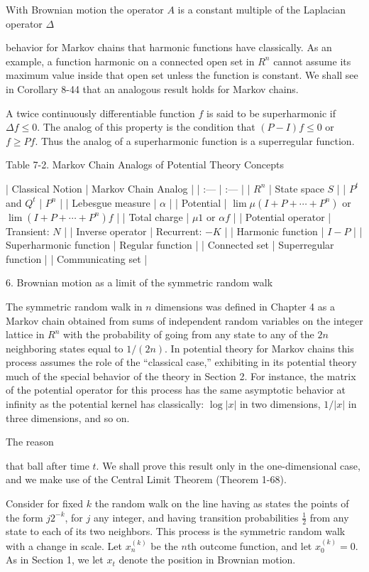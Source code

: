 With Brownian motion the operator $A$ is a constant multiple of the Laplacian operator $\Delta$

behavior for Markov chains that harmonic functions have classically. As an example, a function harmonic on a connected open set in $R^n$ cannot assume its maximum value inside that open set unless the function is constant. We shall see in Corollary 8-44 that an analogous result holds for Markov chains.

A twice continuously differentiable function $f$ is said to be superharmonic if $\Delta f \leq 0$. The analog of this property is the condition that $(P - I)f \leq 0$ or $f \geq Pf$. Thus the analog of a superharmonic function is a superregular function.

Table 7-2. Markov Chain Analogs of Potential Theory Concepts

| Classical Notion | Markov Chain Analog |
| :--- | :--- |
| $R^n$ | State space $S$ |
| $P^t$ and $Q^t$ | $P^n$ |
| Lebesgue measure | $\alpha$ |
| Potential | $\lim \mu(I + P + \cdots + P^n)$ or $\lim (I + P + \cdots + P^n)f$ |
| Total charge | $\mu1$ or $\alpha f$ |
| Potential operator | Transient: $N$ |
| Inverse operator | Recurrent: $-K$ |
| Harmonic function | $I - P$ |
| Superharmonic function | Regular function |
| Connected set | Superregular function |
| Communicating set |

6. Brownian motion as a limit of the symmetric random walk

The symmetric random walk in $n$ dimensions was defined in Chapter 4 as a Markov chain obtained from sums of independent random variables on the integer lattice in $R^n$ with the probability of going from any state to any of the $2n$ neighboring states equal to $1/(2n)$. In potential theory for Markov chains this process assumes the role of the “classical case,” exhibiting in its potential theory much of the special behavior of the theory in Section 2. For instance, the matrix of the potential operator for this process has the same asymptotic behavior at infinity as the potential kernel has classically: $\log |x|$ in two dimensions, $1/|x|$ in three dimensions, and so on.

The reason

that ball after time $t$. We shall prove this result only in the one-dimensional case, and we make use of the Central Limit Theorem (Theorem 1-68).

Consider for fixed $k$ the random walk on the line having as states the points of the form $j2^{-k}$, for $j$ any integer, and having transition probabilities $\frac{1}{2}$ from any state to each of its two neighbors. This process is the symmetric random walk with a change in scale. Let $x_n^{(k)}$ be the $n$th outcome function, and let $x_0^{(k)} = 0$. As in Section 1, we let $x_t$ denote the position in Brownian motion.
